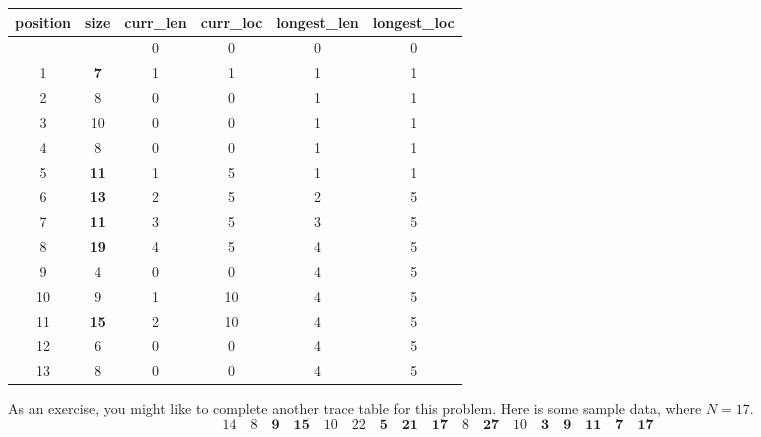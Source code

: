 \bigskip
\begin{center}
  \begin{tabular}{S[table-format=2.0]S[table-format=2.0]S[table-format=2.0]
    S[table-format=2.0]S[table-format=2.0]S[table-format=2.0]}
    \toprule
    {position} & {size}      & {curr\_len} & {curr\_loc} & {longest\_len} & {longest\_loc} \\
    \midrule
               &             & 0           & 0           & 0              & 0              \\
    1          & \bfseries 7  & 1           & 1           & 1              & 1              \\
    2          & 8           & 0           & 0           & 1              & 1              \\
    3          & 10          & 0           & 0           & 1              & 1              \\
    4          & 8           & 0           & 0           & 1              & 1              \\
    5          & \bfseries 11 & 1           & 5           & 1              & 1              \\
    6          & \bfseries 13 & 2           & 5           & 2              & 5              \\
    7          & \bfseries 11 & 3           & 5           & 3              & 5              \\
    8          & \bfseries 19 & 4           & 5           & 4              & 5              \\
    9          & 4           & 0           & 0           & 4              & 5              \\
    10         & 9           & 1           & 10          & 4              & 5              \\
    11         & \bfseries 15 & 2           & 10          & 4              & 5              \\
    12         & 6           & 0           & 0           & 4              & 5              \\
    13         & 8           & 0           & 0           & 4              & 5              \\
    \bottomrule
  \end{tabular}
\end{center}
\bigskip

As an exercise, you might like to complete another trace table for this problem. Here is
some sample data, where $N=17$.\[
  14 \quad 8 \quad 
  \mathbf{9} \quad \mathbf{15} \quad
  10 \quad 22 \quad 
  \mathbf{5} \quad \mathbf{21} \quad \mathbf{17} \quad 
  8 \quad
  \mathbf{27} \quad
  10 \quad
  \mathbf{3} \quad \mathbf{9} \quad \mathbf{11} \quad \mathbf{7} \quad \mathbf{17}
\]

